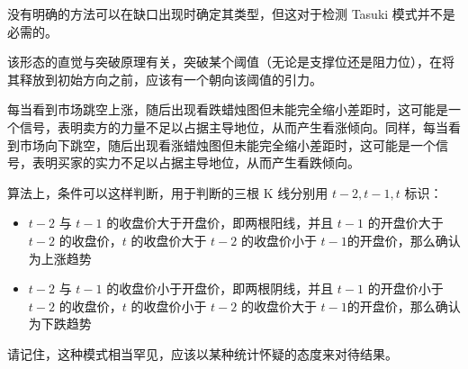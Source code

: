 没有明确的方法可以在缺口出现时确定其类型，但这对于检测 Tasuki 模式并不是必需的。


该形态的直觉与突破原理有关，突破某个阈值（无论是支撑位还是阻力位），在将其释放到初始方向之前，应该有一个朝向该阈值的引力。

每当看到市场跳空上涨，随后出现看跌蜡烛图但未能完全缩小差距时，这可能是一个信号，表明卖方的力量不足以占据主导地位，从而产生看涨倾向。同样，每当看到市场向下跳空，随后出现看涨蜡烛图但未能完全缩小差距时，这可能是一个信号，表明买家的实力不足以占据主导地位，从而产生看跌倾向。

算法上，条件可以这样判断，用于判断的三根 K 线分别用 $t-2,t-1,t$ 标识：
\begin{itemize}
    \item $t-2$ 与 $t-1$ 的收盘价大于开盘价，即两根阳线，并且 $t-1$ 的开盘价大于 $t-2$ 的收盘价，$t$ 的收盘价大于 $t-2$ 的收盘价小于 $t-1$的开盘价，那么确认为上涨趋势
    \item $t-2$ 与 $t-1$ 的收盘价小于开盘价，即两根阴线，并且 $t-1$ 的开盘价小于 $t-2$ 的收盘价，$t$ 的收盘价小于 $t-2$ 的收盘价大于 $t-1$的开盘价，那么确认为下跌趋势
\end{itemize}

请记住，这种模式相当罕见，应该以某种统计怀疑的态度来对待结果。
